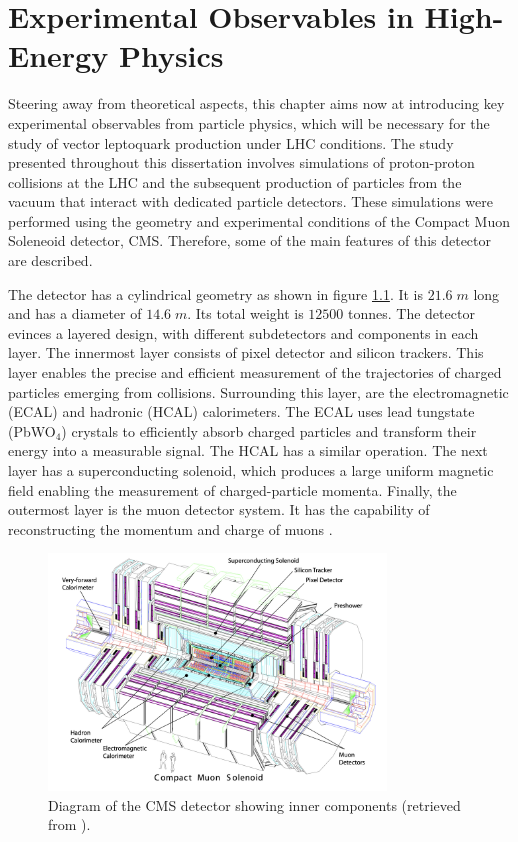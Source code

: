 \chapter{Experimental Observables in High-Energy Physics}
\label{ch:experiment}
\label{ch:chapter3}

Steering away from theoretical aspects, this chapter aims now at introducing key experimental observables from particle physics, which will be necessary for the study of vector leptoquark production under LHC conditions. The study presented throughout this dissertation involves simulations of proton-proton collisions at the LHC and the subsequent production of particles from the vacuum that interact with dedicated particle detectors. These simulations were performed using the geometry and experimental conditions of the Compact Muon Soleneoid detector, CMS. Therefore, some of the main features of this detector are described.

The detector has a cylindrical geometry as shown in figure \ref{fig:cms-detector}. It is $21.6\;\si{m}$ long and has a diameter of $14.6\;\si{m}$. Its total weight is $12500$ tonnes. The detector evinces a layered design, with different subdetectors and components in each layer. The innermost layer consists of pixel detector and silicon trackers. This layer enables the precise and efficient measurement of the trajectories of charged particles emerging from collisions. Surrounding this layer, are the electromagnetic (ECAL) and hadronic (HCAL) calorimeters. The ECAL uses lead tungstate (PbWO$_4$) crystals to efficiently absorb charged particles and transform their energy into a measurable signal. The HCAL has a similar operation. The next layer has a superconducting solenoid, which produces a large uniform magnetic field enabling the measurement of charged-particle momenta. Finally, the outermost layer is the muon detector system. It has the capability of reconstructing the momentum and charge of muons \cite{CMS_experiment}.

\begin{figure}[h]
    \centering
    \includegraphics[width = 0.8\textwidth]{images/cms-detector.png}
    \caption{Diagram of the CMS detector showing inner components (retrieved from \cite{CMS_experiment}).}
    \label{fig:cms-detector}
\end{figure}

